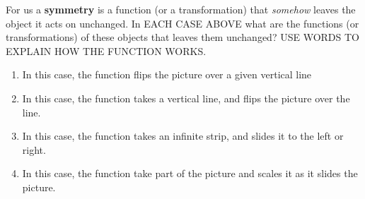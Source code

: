 \documentclass[noauthor,nooutcomes,12pt]{ximera}
\begin{document}
\begin{question}
  For us a \textbf{symmetry} is a function (or a transformation) that
  \textit{somehow} leaves the object it acts on unchanged.  In EACH
  CASE ABOVE what are the functions (or transformations) of these
  objects that leaves them unchanged? USE WORDS TO EXPLAIN HOW THE
  FUNCTION WORKS.
  \begin{freeResponse}
  \begin{enumerate}
  \item In this case, the function flips the picture over a given
    vertical line
  \item In this case, the function takes a vertical line, and flips the picture over the line.
  \item In this case, the function takes an infinite strip, and slides it to the left or right.
  \item In this case, the function take part of the picture and scales
    it as it slides the picture.
  \end{enumerate}
  \end{freeResponse}
  
\end{question}
\end{document}
